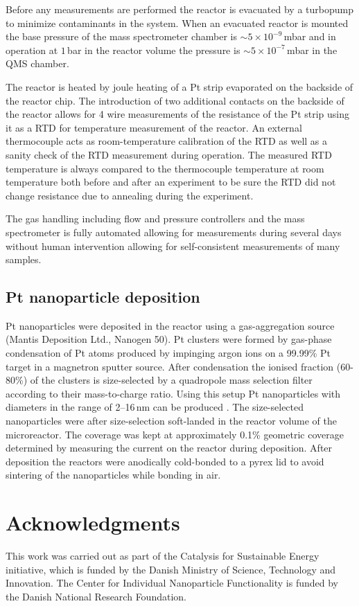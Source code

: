 \documentclass[journal=jacsat,manuscript=article]{achemso}
\begin{document}
Before any measurements are performed the reactor is evacuated by a turbopump to minimize
contaminants in the system. When an evacuated reactor is mounted the base
pressure of the mass spectrometer chamber is $\sim5\times10^{-9}\,$mbar and in
operation at $1\,$bar in the reactor volume the pressure is
$\sim5\times10^{-7}\,$mbar in the QMS chamber.

The reactor is heated by joule heating of a Pt strip evaporated on the backside
of the reactor chip. The introduction of two additional contacts on the
backside of the reactor allows for 4 wire measurements of the resistance of the
Pt strip using it as a RTD for temperature measurement of the reactor. An
external thermocouple acts as room-temperature calibration of the RTD as well
as a sanity check of the RTD measurement during operation. The measured RTD
temperature is always compared to the thermocouple temperature at room temperature both
before and after an experiment to be sure the RTD did not change resistance due
to annealing during the experiment.

The gas handling including flow and pressure controllers and the mass
spectrometer is fully automated allowing for measurements during several days
without human intervention allowing for self-consistent measurements of many
samples.

\subsection{Pt nanoparticle deposition}
Pt nanoparticles were deposited in the reactor using a gas-aggregation source
(Mantis Deposition Ltd., Nanogen 50). Pt clusters were formed by gas-phase
condensation of Pt atoms produced by impinging argon ions on a 99.99\% Pt
target in a magnetron sputter source. After condensation the ionised fraction
(60-80\%) of the clusters is size-selected by a quadropole mass selection
filter according to their mass-to-charge ratio. Using this setup Pt
nanoparticles with diameters in the range of 2--16\,nm can be produced
\cite{Nielsen2010,Nielsen2009}. The size-selected nanoparticles were after
size-selection soft-landed in the reactor volume of the microreactor. The
coverage was kept at approximately 0.1\% geometric coverage determined by
measuring the current on the reactor during deposition. After deposition the
reactors were anodically cold-bonded \cite{Vesborg2010} to a pyrex lid to avoid
sintering of the nanoparticles while bonding in air.

\section{Acknowledgments}
This work was carried out as part of the Catalysis for Sustainable Energy
initiative, which is funded by the Danish Ministry of Science, Technology and
Innovation. The Center for Individual Nanoparticle Functionality is funded by
the Danish National Research Foundation.


\end{document}
